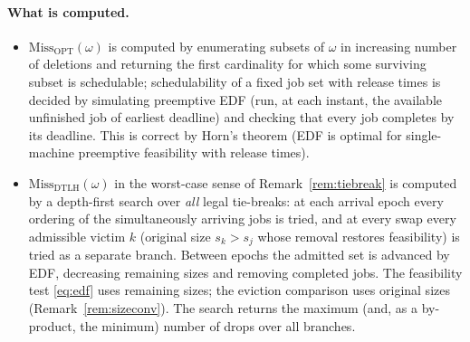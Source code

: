 \documentclass{amsart}
\theoremstyle{definition}
\begin{document}
\paragraph{What is computed.}
\begin{itemize}
\item $\mathrm{Miss}_{\mathrm{OPT}}(\omega)$ is computed by enumerating subsets
of $\omega$ in increasing number of deletions and returning the first cardinality
for which some surviving subset is schedulable; schedulability of a fixed job set
with release times is decided by simulating preemptive EDF (run, at each instant,
the available unfinished job of earliest deadline) and checking that every job
completes by its deadline. This is correct by Horn's theorem (EDF is optimal for
single-machine preemptive feasibility with release times).
\item $\mathrm{Miss}_{\mathrm{DTLH}}(\omega)$ in the worst-case sense of
Remark~\ref{rem:tiebreak} is computed by a depth-first search over \emph{all}
legal tie-breaks: at each arrival epoch every ordering of the simultaneously
arriving jobs is tried, and at every swap every admissible victim $k$ (original
size $s_k>s_j$ whose removal restores feasibility) is tried as a separate branch.
Between epochs the admitted set is advanced by EDF, decreasing remaining sizes and
removing completed jobs. The feasibility test \eqref{eq:edf} uses remaining sizes;
the eviction comparison uses original sizes (Remark~\ref{rem:sizeconv}). The
search returns the maximum (and, as a by-product, the minimum) number of drops
over all branches.
\end{itemize}
\end{document}
